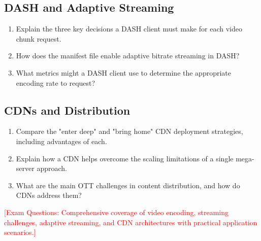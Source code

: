 \documentclass[12pt]{article}
\begin{document}
\subsection*{DASH and Adaptive Streaming}
\begin{enumerate}
    \item Explain the three key decisions a DASH client must make for each video chunk request.
    \item How does the manifest file enable adaptive bitrate streaming in DASH?
    \item What metrics might a DASH client use to determine the appropriate encoding rate to request?
\end{enumerate}

\subsection*{CDNs and Distribution}
\begin{enumerate}
    \item Compare the "enter deep" and "bring home" CDN deployment strategies, including advantages of each.
    \item Explain how a CDN helps overcome the scaling limitations of a single mega-server approach.
    \item What are the main OTT challenges in content distribution, and how do CDNs address them?
\end{enumerate}

\textcolor{red}{[Exam Questions: Comprehensive coverage of video encoding, streaming challenges, adaptive streaming, and CDN architectures with practical application scenarios.]}
\end{document}
